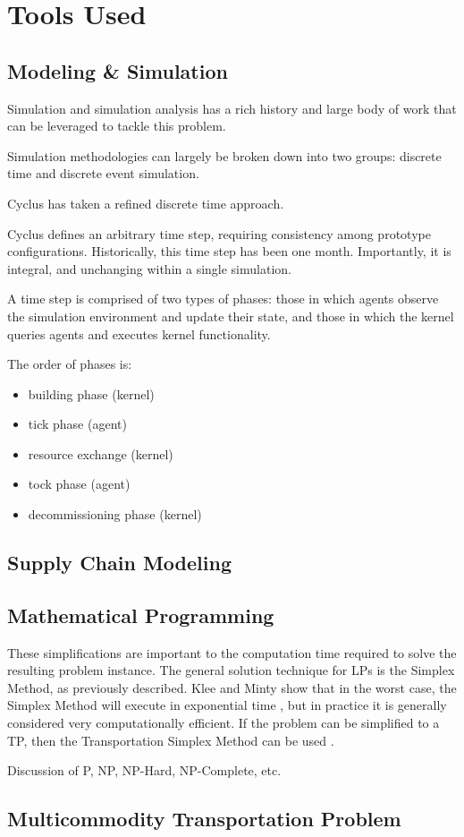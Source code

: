 
\section{Tools Used}

\subsection{Modeling \& Simulation}\label{intro:sim}

Simulation and simulation analysis has a rich history and large body of work
that can be leveraged to tackle this problem.

Simulation methodologies can largely be broken down into two groups: discrete
time and discrete event simulation. 

Cyclus has taken a refined discrete time approach.

Cyclus defines an arbitrary time step, requiring consistency among prototype
configurations. Historically, this time step has been one month. Importantly, it
is integral, and unchanging within a single simulation.

A time step is comprised of two types of phases: those in which agents observe
the simulation environment and update their state, and those in which the kernel
queries agents and executes kernel functionality.

The order of phases is:

\begin{itemize}
  \item building phase (kernel)
  \item tick phase (agent)
  \item resource exchange (kernel)
  \item tock phase (agent)
  \item decommissioning phase (kernel)
\end{itemize}

\subsection{Supply Chain Modeling}

\subsection{Mathematical Programming}\label{intro:prog}

These simplifications are important to the computation time required to solve
the resulting problem instance. The general solution technique for LPs is the
Simplex Method, as previously described. Klee and Minty show that in the worst
case, the Simplex Method will execute in exponential time \cite{klee_good_1970},
but in practice it is generally considered very computationally efficient. If
the problem can be simplified to a TP, then the Transportation Simplex Method
can be used \cite{ahuja_network_1993}.

Discussion of P, NP, NP-Hard, NP-Complete, etc.

\subsection{Multicommodity Transportation Problem}\label{intro:mtp}
